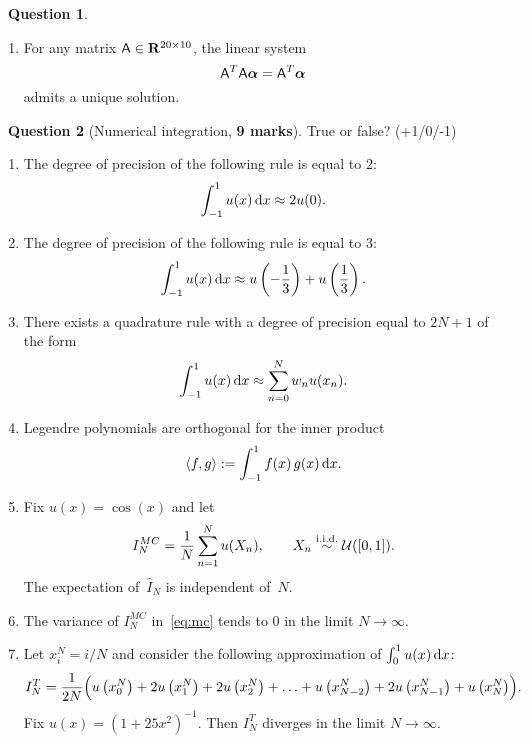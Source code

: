 \documentclass[11pt]{article}
\theoremstyle{definition}
\newtheorem{question}{{\normalfont \faGears}~Question}
\renewcommand{\mymarks}[1]{\textbf{#1 marks}}
\begin{document}
\begin{question}
\begin{enumerate}
        \item
            For any matrix $\mathsf A \in \mathbf R^{20 \times 10}$,
            the linear system
            \[
                \mathsf A^T \mathsf A \mathbf{\boldsymbol{\alpha}} = \mathsf A^T \mathbf{\boldsymbol{\alpha}}
            \]
            admits a unique solution.
    \end{enumerate}
\end{question}

\newpage
\begin{question}
    [Numerical integration, \mymarks{9}]
    True or false? (+1/0/-1)
    \begin{enumerate}
        \item
            The degree of precision of the following rule is equal to 2:
            \[
                \int_{-1}^{1} u(x) \, \mathrm d x \approx 2u(0).
            \]

        \item
            The degree of precision of the following rule is equal to 3:
            \[
                \int_{-1}^{1} u(x) \, \mathrm d x \approx u \left(-\frac{1}{3}\right) + u \left(\frac{1}{3}\right).
            \]

        \item
            There exists a quadrature rule with a degree of precision equal to $2N + 1$ of the form
            \[
                \int_{-1}^{1} u(x) \, \mathrm d x \approx
                \sum_{n=0}^{N} w_n u(x_n).
            \]

        \item
            Legendre polynomials are orthogonal for the inner product
            \[
                \langle f, g\rangle := \int_{-1}^{1} f(x) \, g(x) \,  \mathrm d x.
            \]

        \item
            Fix $u(x) = \cos(x)$ and let
            \begin{equation}
                \label{eq:mc}
                I^{MC}_N = \frac{1}{N} \sum_{n=1}^{N} u(X_n), \qquad X_n \stackrel{\rm i.i.d.}{\sim} \mathcal U([0, 1]).
            \end{equation}
            The expectation of~$\widehat I_N$ is independent of~$N$.

        \item
            The variance of $I^{MC}_N$ in~\eqref{eq:mc} tends to 0 in the limit $N \to \infty$.

        \item
            Let $x^N_i = i/N$ and consider the following approximation of $\int_{0}^{1} u(x) \, \mathrm d x$:
            \begin{equation}
                \label{eq:trapezium}
                I^T_N = \frac{1}{2N} \Bigl( u\left(x^N_0\right) + 2 u\left(x^N_1\right) + 2 u\left(x^N_2\right) + \dotsc + u\left(x^N_{N-2}\right) + 2 u\left(x^N_{N-1}\right) + u\left(x^N_N\right) \Bigr).
            \end{equation}
            Fix $u(x) = (1 + 25 x^2)^{-1}$.
            Then $I^T_N$ diverges in the limit $N \to \infty$.


\end{enumerate}
\end{question}
\end{document}
